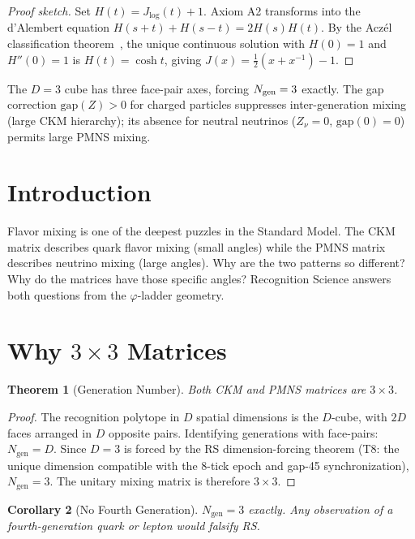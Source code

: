 \documentclass[12pt,a4paper]{article}
\newtheorem{theorem}{Theorem}[section]
\newtheorem{corollary}[theorem]{Corollary}
\theoremstyle{definition}
\theoremstyle{remark}
\begin{document}
\begin{proof}[Proof sketch]
Set $H(t) = J_{\log}(t)+1$.  Axiom A2 transforms into the d'Alembert
equation $H(s+t)+H(s-t)=2H(s)H(t)$.  By the Acz\'el classification
theorem~\cite{Aczel1966}, the unique continuous solution with $H(0)=1$
and $H''(0)=1$ is $H(t)=\cosh t$, giving
$J(x)=\tfrac{1}{2}(x+x^{-1})-1$.
\end{proof}

\noindent The $D=3$ cube has three face-pair axes, forcing
$N_{\rm gen}=3$ exactly.  The gap correction $\mathrm{gap}(Z)>0$
for charged particles suppresses inter-generation mixing (large
CKM hierarchy); its absence for neutral neutrinos ($Z_\nu=0$,
$\mathrm{gap}(0)=0$) permits large PMNS mixing.

\section{Introduction}
\label{sec:intro}

Flavor mixing is one of the deepest puzzles in the Standard Model.
The CKM matrix describes quark flavor mixing (small angles) while the
PMNS matrix describes neutrino mixing (large angles).  Why are the two
patterns so different?  Why do the matrices have those specific angles?
Recognition Science answers both questions from the $\varphi$-ladder
geometry.

\section{Why $3 \times 3$ Matrices}
\label{sec:3x3}

\begin{theorem}[Generation Number]
Both CKM and PMNS matrices are $3 \times 3$.
\end{theorem}

\begin{proof}
The recognition polytope in $D$ spatial dimensions is the $D$-cube,
with $2D$ faces arranged in $D$ opposite pairs.  Identifying generations
with face-pairs: $N_{\mathrm{gen}} = D$.  Since $D = 3$ is forced by
the RS dimension-forcing theorem (T8: the unique dimension compatible
with the 8-tick epoch and gap-45 synchronization), $N_{\mathrm{gen}} = 3$.
The unitary mixing matrix is therefore $3 \times 3$.
\end{proof}

\begin{corollary}[No Fourth Generation]
$N_{\mathrm{gen}} = 3$ exactly.  Any observation of a fourth-generation
quark or lepton would falsify RS.
\end{corollary}
\end{document}
